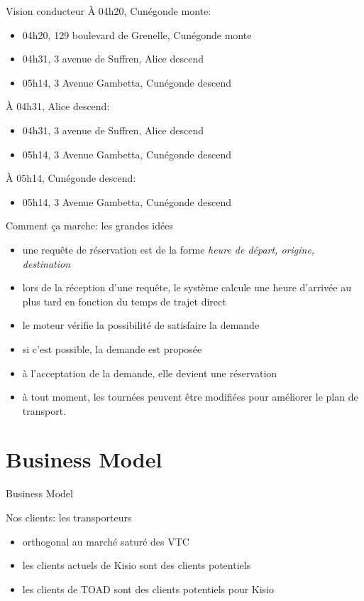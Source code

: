 \documentclass[table]{beamer}
\begin{document}
\begin{frame}[allowframebreaks]{Vision conducteur}
  À 04h20, Cunégonde monte:
  \begin{itemize}
  \item<42> 04h20, 129 boulevard de Grenelle, Cunégonde monte
  \item 04h31, 3 avenue de Suffren, Alice descend
  \item 05h14, 3 Avenue Gambetta, Cunégonde descend
  \end{itemize}\framebreak

  À 04h31, Alice descend:
  \begin{itemize}
  \item<42> 04h31, 3 avenue de Suffren, Alice descend
  \item 05h14, 3 Avenue Gambetta, Cunégonde descend
  \end{itemize}\framebreak

  À 05h14, Cunégonde descend:
  \begin{itemize}
  \item<42> 05h14, 3 Avenue Gambetta, Cunégonde descend
  \end{itemize}
\end{frame}

\begin{frame}{Comment ça marche: les grandes idées}
  \begin{itemize}
  \item une requête de réservation est de la forme \emph{heure de
      départ, origine, destination}
  \item lors de la réception d'une requête, le système calcule une heure
    d'arrivée au plus tard en fonction du temps de trajet direct
  \item le moteur vérifie la possibilité de satisfaire la demande
  \item si c'est possible, la demande est proposée
  \item à l'acceptation de la demande, elle devient une réservation
  \item à tout moment, les tournées peuvent être modifiées pour
    améliorer le plan de transport.
  \end{itemize}
\end{frame}

\section{Business Model}

\begin{frame}{Business Model}

  Nos clients: les transporteurs
  \begin{itemize}
  \item orthogonal au marché saturé des VTC
  \item les clients actuels de Kisio sont des clients potentiels
  \item les clients de TOAD sont des clients potentiels pour Kisio
  \end{itemize}
\end{frame}
\end{document}
